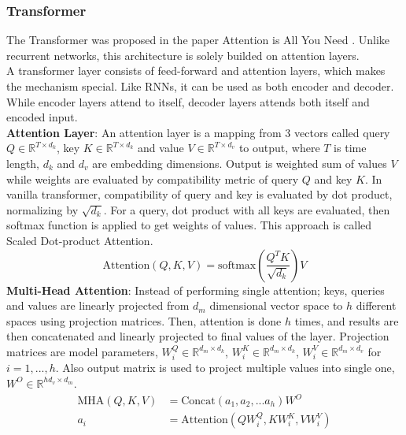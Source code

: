 \subsubsection{Transformer}
The Transformer was proposed in the paper Attention is All You Need \cite{vaswani_attention_2017} . Unlike recurrent networks, this architecture is solely builded on attention layers. \\
A transformer layer consists of feed-forward and attention layers, which makes the mechanism special. Like RNNs, it can be used as both encoder and decoder. While encoder layers attend to itself, decoder layers attends both itself and encoded input. \\
\textbf{Attention Layer}: An attention layer is a mapping from 3 vectors called query $Q \in \mathbb{R}^{T \times d_k}$, key $K \in \mathbb{R}^{T \times d_k}$ and value $V \in \mathbb{R}^{T \times d_v}$ to output, where $T$ is time length, $d_k$ and $d_v$ are embedding dimensions. Output is weighted sum of values $V$ while weights are evaluated by compatibility metric of query $Q$ and key $K$. In vanilla transformer, compatibility of query and key is evaluated by dot product, normalizing by $\sqrt{d_k}$. For a query, dot product with all keys are evaluated, then softmax function is applied to get weights of values. This approach is called Scaled Dot-product Attention. \\
\begin{equation}
\mathrm{Attention}(Q, K, V) = \mathrm{softmax}(\frac{Q^{T} K}{\sqrt{d_k}}) V
\end{equation}
\textbf{Multi-Head Attention}: Instead of performing single attention; keys, queries and values are linearly projected from $d_m$ dimensional vector space to $h$ different spaces using projection matrices. Then, attention is done $h$ times, and results are then concatenated and linearly projected to final values of the layer.
Projection matrices are model parameters, $W^Q_i \in \mathbb{R}^{d_m \times d_k}$, $W^K_i \in \mathbb{R}^{d_m \times d_k}$, $W^V_i \in \mathbb{R}^{d_m \times d_v}$ for $i=1,...,h$. Also output matrix is used to project multiple values into single one, $W^O \in \mathbb{R}^{h d_v \times d_m}$. \\
\begin{equation}
\begin{split}
\mathrm{MHA}(Q,K,V) &=  \text{Concat}(a_1, a_2, ... a_h)W^O \\
a_i &=  \text{Attention}(QW^Q_i,KW^K_i,VW^V_i)
\end{split}
\end{equation}
